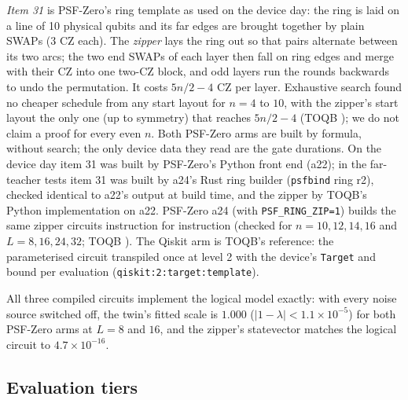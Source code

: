 \documentclass[11pt]{article}
\begin{document}
\emph{Item 31} is PSF-Zero's ring template as used on the device day: the ring is laid on a line of 10 physical
qubits and its far edges are brought together by plain SWAPs (3 CZ each). The \emph{zipper} lays the ring out so that
pairs alternate between its two arcs; the two end SWAPs of each layer then fall on ring edges and merge with their
CZ into one two-CZ block, and odd layers run the rounds backwards to undo the permutation. It costs $5n/2 - 4$ CZ per
layer. Exhaustive search found no cheaper schedule from any start layout for $n = 4$ to $10$, with the zipper's
start layout the only one (up to symmetry) that reaches $5n/2 - 4$ (TOQB ); we
do not claim a proof for every even $n$. Both PSF-Zero arms are built by
formula, without search; the only device data they read are the gate durations. On the device day item 31 was built by PSF-Zero's Python front end (a22); in the far-teacher tests item 31 was
built by a24's Rust ring builder (\texttt{psfbind} ring r2), checked identical to a22's output at build time, and the
zipper by TOQB's Python implementation on a22. PSF-Zero a24 (with \texttt{PSF\_RING\_ZIP=1}) builds the same
zipper circuits instruction for instruction (checked for $n = 10, 12, 14, 16$ and $L = 8, 16, 24, 32$; TOQB
). The Qiskit arm is TOQB's
reference: the parameterised circuit transpiled once at level 2 with the device's \texttt{Target} and bound per
evaluation (\texttt{qiskit:2:target:template}).

All three compiled circuits implement the logical model exactly: with every noise source switched off, the twin's
fitted scale is $1.000$ ($|1-\lambda| < 1.1\times10^{-5}$) for both PSF-Zero arms at $L = 8$ and $16$, and the
zipper's statevector matches the logical circuit to $4.7\times10^{-16}$.

\subsection{Evaluation tiers}
\end{document}
